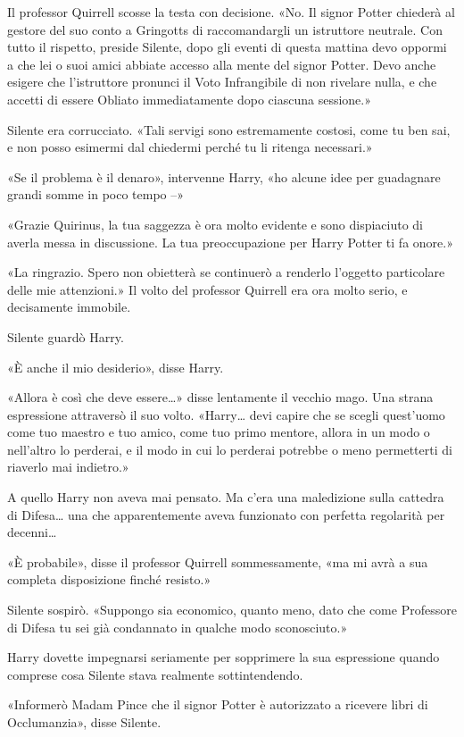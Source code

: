 Il professor Quirrell scosse la testa con decisione. «No. Il signor Potter chiederà al gestore del suo conto a Gringotts di raccomandargli un istruttore neutrale. Con tutto il rispetto, preside Silente, dopo gli eventi di questa mattina devo oppormi a che lei o suoi amici abbiate accesso alla mente del signor Potter. Devo anche esigere che l’istruttore pronunci il Voto Infrangibile di non rivelare nulla, e che accetti di essere Obliato immediatamente dopo ciascuna sessione.»

Silente era corrucciato. «Tali servigi sono estremamente costosi, come tu ben sai, e non posso esimermi dal chiedermi perché tu li ritenga necessari.»

«Se il problema è il denaro», intervenne Harry, «ho alcune idee per guadagnare grandi somme in poco tempo –»

«Grazie Quirinus, la tua saggezza è ora molto evidente e sono dispiaciuto di averla messa in discussione. La tua preoccupazione per Harry Potter ti fa onore.»

«La ringrazio. Spero non obietterà se continuerò a renderlo l’oggetto particolare delle mie attenzioni.» Il volto del professor Quirrell era ora molto serio, e decisamente immobile.

Silente guardò Harry.

«È anche il mio desiderio», disse Harry.

«Allora è così che deve essere…» disse lentamente il vecchio mago. Una strana espressione attraversò il suo volto. «Harry… devi capire che se scegli quest’uomo come tuo maestro e tuo amico, come tuo primo mentore, allora in un modo o nell’altro lo perderai, e il modo in cui lo perderai potrebbe o meno permetterti di riaverlo mai indietro.»

A quello Harry non aveva mai pensato. Ma c’era una maledizione sulla cattedra di Difesa… una che apparentemente aveva funzionato con perfetta regolarità per decenni…

«È probabile», disse il professor Quirrell sommessamente, «ma mi avrà a sua completa disposizione finché resisto.»

Silente sospirò. «Suppongo sia economico, quanto meno, dato che come Professore di Difesa tu sei già condannato in qualche modo sconosciuto.»

Harry dovette impegnarsi seriamente per sopprimere la sua espressione quando comprese cosa Silente stava realmente sottintendendo.

«Informerò Madam Pince che il signor Potter è autorizzato a ricevere libri di Occlumanzia», disse Silente.

